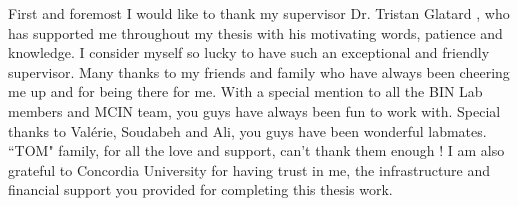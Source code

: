 \begin{acknowledgments}
First and foremost I would like to thank my supervisor Dr. Tristan Glatard , who has supported me throughout my thesis with his motivating words, patience and knowledge. I consider myself so lucky to have such an exceptional and friendly supervisor.
Many thanks to my friends and family who have always been cheering me up and for being there for me. With a special mention to all the BIN Lab members and MCIN team, you guys have always been fun to work with. Special thanks to Val\'erie, Soudabeh and Ali, you guys have been wonderful labmates. ``TOM" family, for all the love and support, can't thank them enough !
I am also grateful to Concordia University for having trust in me, the infrastructure and financial support you provided for completing this thesis work.
\end{acknowledgments}
